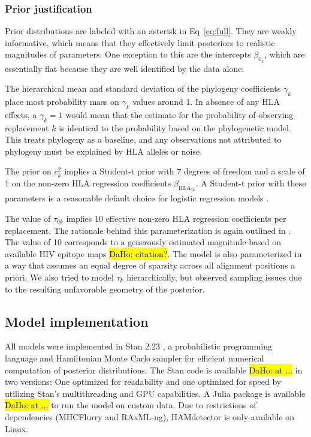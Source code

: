 \documentclass{bioinfo}
\begin{document}
\begin{methods}
\subsubsection{Prior justification}

Prior distributions are labeled with an asterisk in Eq~\ref{eq:full}. They are weakly informative, which means that they effectively limit posteriors to realistic magnitudes of parameters. One exception to this are the intercepts \(\beta_{0_k}\), which are essentially flat because they are well identified by the data alone. 

The hierarchical mean and standard deviation of the phylogeny coefficients \(\gamma_k\) place most probability mass on \(\gamma_k\) values around 1. In absence of any HLA effects, a $\gamma_k=1$ would mean that the estimate for the probability of observing replacement $k$ is identical to the probability based on the phylogenetic model. This treats phylogeny as a baseline, and any observations not attributed to phylogeny must be explained by HLA alleles or noise.

The prior on $c_k^2$ implies a Student-t prior with 7 degrees of freedom and a scale of 1 on the non-zero HLA regression coefficients \(\beta_{\text{HLA}_{jk}}\). A Student-t prior with these parameters is a reasonable default choice for logistic regression models \citep{Piironen2017}.

The value of \(\tau_{0k}\) implies 10 effective non-zero HLA regression coefficients per replacement. The rationale behind this parameterization is again outlined in \citet{Piironen2017}. The value of 10 corresponds to a generously estimated magnitude based on available HIV epitope maps \hl{DaHo: citation?}.
The model is also parameterized in a way that assumes an equal degree of sparsity across all alignment positions a priori. We also tried to model \(\tau_k\) hierarchically, but observed sampling issues due to the resulting unfavorable geometry of the posterior.


\subsection{Model implementation}
All models were implemented in Stan 2.23 \citep{Stan2021}, a probabilistic programming language and Hamiltonian Monte Carlo sampler for efficient numerical computation of posterior distributions. The Stan code is available \hl{DaHo: at ...} in two versions: One optimized for readability and one optimized for speed by utilizing Stan's multithreading and GPU capabilities. A Julia \citep{Bezanson2017} package is available \hl{DaHo: at ...} to run the model on custom data. Due to restrictions of dependencies (MHCFlurry and RAxML-ng), HAMdetector is only available on Linux. %



\end{methods}
\end{document}
